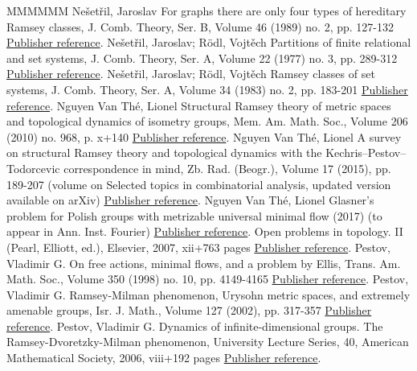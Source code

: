 \documentclass[11pt]{article}
\theoremstyle{definition}
\numberwithin{equation}{section}
\numberwithin{figure}{section}
\numberwithin{table}{section}
\begin{document}
\begin{thebibliography}{MMMMMM}
 Nešetřil, Jaroslav For graphs there are only four types of hereditary Ramsey classes, J. Comb. Theory, Ser. B, Volume 46 (1989) no. 2, pp. 127-132 \href{https://ahl.centre-mersenne.org/item/AHL_2019__2__149_0/#Ne1}{Publisher reference}.
 Nešetřil, Jaroslav; Rödl, Vojtěch Partitions of finite relational and set systems, J. Comb. Theory, Ser. A, Volume 22 (1977) no. 3, pp. 289-312 \href{https://ahl.centre-mersenne.org/item/AHL_2019__2__149_0/#NR1}{Publisher reference}.
 Nešetřil, Jaroslav; Rödl, Vojtěch Ramsey classes of set systems, J. Comb. Theory, Ser. A, Volume 34 (1983) no. 2, pp. 183-201 \href{https://ahl.centre-mersenne.org/item/AHL_2019__2__149_0/#NR2}{Publisher reference}.
 Nguyen Van Thé, Lionel Structural Ramsey theory of metric spaces and topological dynamics of isometry groups, Mem. Am. Math. Soc., Volume 206 (2010) no. 968, p. x+140 \href{https://ahl.centre-mersenne.org/item/AHL_2019__2__149_0/#NVT1}{Publisher reference}.
 Nguyen Van Thé, Lionel A survey on structural Ramsey theory and topological dynamics with the Kechris–Pestov–Todorcevic correspondence in mind, Zb. Rad. (Beogr.), Volume 17 (2015), pp. 189-207 (volume on Selected topics in combinatorial analysis, updated version available on arXiv) \href{https://ahl.centre-mersenne.org/item/AHL_2019__2__149_0/#NVT6}{Publisher reference}.
 Nguyen Van Thé, Lionel Glasner’s problem for Polish groups with metrizable universal minimal flow (2017) (to appear in Ann. Inst. Fourier) \href{https://ahl.centre-mersenne.org/item/AHL_2019__2__149_0/#NVT8}{Publisher reference}.
 Open problems in topology. II (Pearl, Elliott, ed.), Elsevier, 2007, xii+763 pages \href{https://ahl.centre-mersenne.org/item/AHL_2019__2__149_0/#OT}{Publisher reference}.
 Pestov, Vladimir G. On free actions, minimal flows, and a problem by Ellis, Trans. Am. Math. Soc., Volume 350 (1998) no. 10, pp. 4149-4165 \href{https://ahl.centre-mersenne.org/item/AHL_2019__2__149_0/#Pe1}{Publisher reference}.
 Pestov, Vladimir G. Ramsey-Milman phenomenon, Urysohn metric spaces, and extremely amenable groups, Isr. J. Math., Volume 127 (2002), pp. 317-357 \href{https://ahl.centre-mersenne.org/item/AHL_2019__2__149_0/#Pe0}{Publisher reference}.
 Pestov, Vladimir G. Dynamics of infinite-dimensional groups. The Ramsey-Dvoretzky-Milman phenomenon, University Lecture Series, 40, American Mathematical Society, 2006, viii+192 pages \href{https://ahl.centre-mersenne.org/item/AHL_2019__2__149_0/#Pe}{Publisher reference}.

\end{thebibliography}
\end{document}

